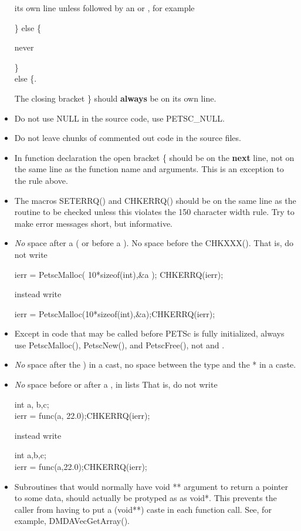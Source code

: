 \documentclass[twoside,12pt]{../sty/report_petsc}
\begin{document}
\begin{itemize}
      its own line unless followed by an  or , for example
\begin{tabbing}
   \} else \{ \\
\end{tabbing}
never
\begin{tabbing}
   \} \\
   else \{.
\end{tabbing}
 The closing bracket \} should {\bf always} be on its own line.
\item Do not use NULL in the source code, use PETSC\_NULL.
\item Do not leave chunks of commented out code in the source files.
\item In function declaration the open bracket \{ should be on the {\bf next} line, not on the same line as the function name and
      arguments. This is an exception to the rule above.
\item The macros SETERRQ() and CHKERRQ() should be on the
      same line as the routine to be checked unless this violates the
      150 character width rule. Try to make error messages short, but
      informative.
\item {\em No} space after a ( or before a ). No space before the CHKXXX(). That is, do not write
\begin{tabbing}
   ierr = PetscMalloc( 10*sizeof(int),\&a ); CHKERRQ(ierr);
\end{tabbing}
instead write
\begin{tabbing}
   ierr = PetscMalloc(10*sizeof(int),\&a);CHKERRQ(ierr);
\end{tabbing}
\item Except in code that may be called before PETSc is fully initialized, always use PetscMalloc(), PetscNew(), and PetscFree(), not  and .
\item {\em No} space after the ) in a cast, no space between the type and the * in a caste.
\item {\em No} space before or after a , in lists
That is, do not write
\begin{tabbing}
    int a, b,c;\\
    ierr = func(a, 22.0);CHKERRQ(ierr);
\end{tabbing}
instead write
\begin{tabbing}
    int a,b,c;\\
    ierr = func(a,22.0);CHKERRQ(ierr);
\end{tabbing}

\item Subroutines that would normally have void ** argument to return a pointer to some data, should actually be protyped as as void*. This prevents the caller from having to put a (void**) caste in each function call. See, for example, DMDAVecGetArray().


\end{itemize}
\end{document}
